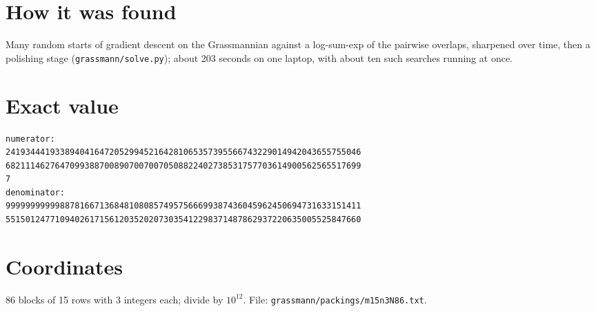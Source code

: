 \documentclass[11pt,a4paper]{article}
\begin{document}
\section{How it was found}
Many random starts of gradient descent on the Grassmannian against a log-sum-exp of the pairwise overlaps, sharpened over time, then a polishing stage (\texttt{grassmann/solve.py}); about 203 seconds on one laptop, with about ten such searches running at once.


\appendix
\section{Exact value}
{\small
\begin{verbatim}
numerator:
241934441933894041647205299452164281065357395566743229014942043655755046
682111462764709938870089070070070508822402738531757703614900562565517699
7
denominator:
999999999998878166713684810808574957566699387436045962450694731633151411
551501247710940261715612035202073035412298371487862937220635005525847660
\end{verbatim}}

\section{Coordinates}
86 blocks of 15 rows with 3 integers each; divide by $10^{12}$. File: \texttt{grassmann/packings/m15n3N86.txt}.
{\tiny
\begin{multicols}{3}
\end{multicols}}
\end{document}
